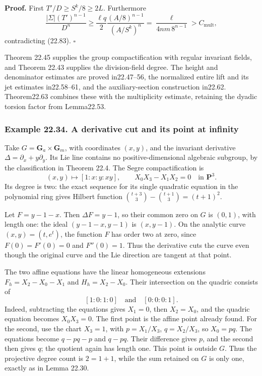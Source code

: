 \documentclass[
  11pt,
  a4paper,
]{article}
\begin{document}
\textbf{Proof.} First \(T'/D\ge S^k/8\ge2L\). Furthermore \[
 \frac{|\Sigma|(T')^{n-1}}{D^n}
 \ge\frac{\ell q}{2}\frac{(A/8)^{n-1}}{(A/S^k)^n}
 =\frac{\ell}{4nm\,8^{n-1}}
 >C_{\mathrm{mult}},
 \tag{22.89}
\] contradicting (22.83). \(\square\)

Theorem 22.45 supplies the group compactification with regular invariant
fields, and Theorem 22.43 supplies the division-field degree. The height
and denominator estimates are proved in22.47--56, the normalized entire
lift and its jet estimates in22.58--61, and the auxiliary-section
construction in22.62. Theorem22.63 combines these with the multiplicity
estimate, retaining the dyadic torsion factor from Lemma22.53.

\subsubsection{Example 22.34. A derivative cut and its point at
infinity}\label{example-22.34.-a-derivative-cut-and-its-point-at-infinity}

Take \(G=\mathbf G_a\times\mathbf G_m\), with coordinates \((x,y)\), and
the invariant derivative \(\Delta=\partial_x+y\partial_y\). Its Lie line
contains no positive-dimensional algebraic subgroup, by the
classification in Theorem 22.4. The Segre compactification is \[
 (x,y)\longmapsto[1:x:y:xy],\qquad
 X_0X_3-X_1X_2=0\quad\text{in }\mathbf P^3.
 \tag{22.90}
\] Its degree is two: the exact sequence for its single quadratic
equation in the polynomial ring gives Hilbert function
\(\binom{t+3}{3}-\binom{t+1}{3}=(t+1)^2\).

Let \(F=y-1-x\). Then \(\Delta F=y-1\), so their common zero on \(G\) is
\((0,1)\), with length one: the ideal \((y-1-x,y-1)\) is \((x,y-1)\). On
the analytic curve \((x,y)=(t,e^t)\), the function \(F\) has order two
at zero, since \(F(0)=F'(0)=0\) and \(F''(0)=1\). Thus the derivative
cuts the curve even though the original curve and the Lie direction are
tangent at that point.

The two affine equations have the linear homogeneous extensions
\(F_h=X_2-X_0-X_1\) and \(H_h=X_2-X_0\). Their intersection on the
quadric consists of \[
       [1:0:1:0]\quad\text{and}\quad[0:0:0:1].
 \tag{22.91}
\] Indeed, subtracting the equations gives \(X_1=0\), then \(X_2=X_0\),
and the quadric equation becomes \(X_0X_3=0\). The first point is the
affine point already found. For the second, use the chart \(X_3=1\),
with \(p=X_1/X_3\), \(q=X_2/X_3\), so \(X_0=pq\). The equations become
\(q-pq-p\) and \(q-pq\). Their difference gives \(p\), and the second
then gives \(q\); the quotient again has length one. This point is
outside \(G\). Thus the projective degree count is \(2=1+1\), while the
sum retained on \(G\) is only one, exactly as in Lemma 22.30.
\end{document}
